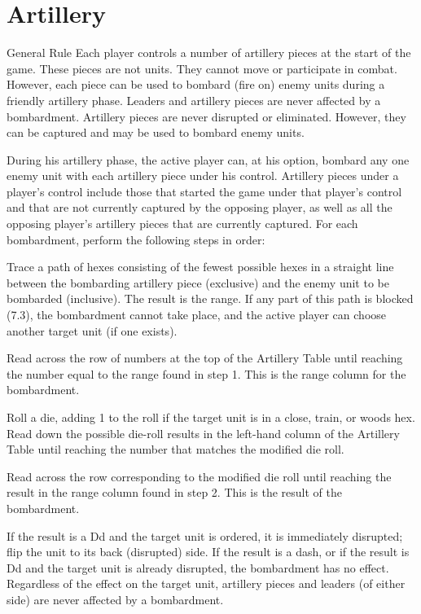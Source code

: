 \section{Artillery}

\begin{rulebox}{General Rule}
Each player controls a number of artillery pieces at the start of the game. These pieces are not units. They cannot move or participate in combat. However, each piece can be used to bombard (fire on) enemy units during a friendly artillery phase. Leaders and artillery pieces are never affected by a bombardment. Artillery pieces are never disrupted or eliminated. However, they can be captured and may be used to bombard enemy units.
\end{rulebox}


During his artillery phase, the active player can, at his option, bombard any one enemy unit with each artillery piece under his control. Artillery pieces under a player's control include those that started the game under that player's control and that are not currently captured by the opposing player, as well as all the opposing player's artillery pieces that are currently captured. For each bombardment, perform the following steps in order:

\begin{steps}
  \item Trace a path of hexes consisting of the fewest possible hexes in a straight line between the bombarding artillery piece (exclusive) and the enemy unit to be bombarded (inclusive). The result is the range. If any part of this path is blocked (7.3), the bombardment cannot take place, and the active player can choose another target unit (if one exists).
  \item Read across the row of numbers at the top of the Artillery Table until reaching the number equal to the range found in step 1. This is the range column for the bombardment.
  \item Roll a die, adding 1 to the roll if the target unit is in a close, train, or woods hex. Read down the possible die-roll results in the left-hand column of the Artillery Table until reaching the number that matches the modified die roll.
  \item Read across the row corresponding to the modified die roll until reaching the result in the range column found in step 2. This is the result of the bombardment.
  \item If the result is a Dd and the target unit is ordered, it is immediately disrupted; flip the unit to its back (disrupted) side. If the result is a dash, or if the result is Dd and the target unit is already disrupted, the bombardment has no effect. Regardless of the effect on the target unit, artillery pieces and leaders (of either side) are never affected by a bombardment.
\end{steps}

